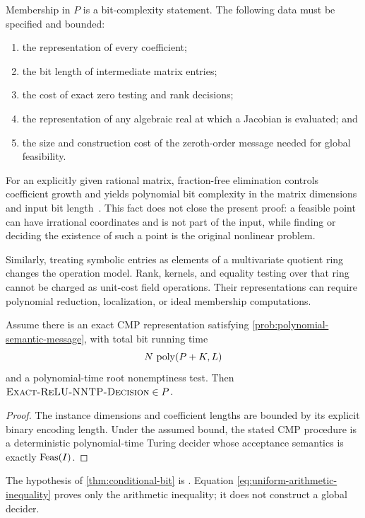 Membership in \(P\) is a bit-complexity statement.  The following data must be
specified and bounded:

\begin{enumerate}
  \item the representation of every coefficient;
  \item the bit length of intermediate matrix entries;
  \item the cost of exact zero testing and rank decisions;
  \item the representation of any algebraic real at which a Jacobian is
  evaluated; and
  \item the size and construction cost of the zeroth-order message needed for
  global feasibility.
\end{enumerate}

For an explicitly given rational matrix, fraction-free elimination controls
coefficient growth and yields polynomial bit complexity in the matrix
dimensions and input bit length~\cite{Bareiss1968}.  This fact does not close
the present proof: a feasible point can have irrational coordinates and is not
part of the input, while finding or deciding the existence of such a point is
the original nonlinear problem.

Similarly, treating symbolic entries as elements of a multivariate quotient
ring changes the operation model.  Rank, kernels, and equality testing over
that ring cannot be charged as unit-cost field operations.  Their
representations can require polynomial reduction, localization, or ideal
membership computations.

\begin{theorem}
\label{thm:conditional-bit}
Assume there is an exact CMP representation satisfying
\cref{prob:polynomial-semantic-message}, with total bit running time
\begin{equation}
  N\,\operatorname{poly}(P+K,L)
  \label{eq:desired-bit-bound}
\end{equation}
and a polynomial-time root nonemptiness test.  Then
\(\textnormal{\textsc{Exact-ReLU-NNTP-Decision}}\in P\).
\end{theorem}

\begin{proof}
The instance dimensions and coefficient lengths are bounded by its explicit
binary encoding length.  Under the assumed bound, the stated CMP procedure is
a deterministic polynomial-time Turing decider whose acceptance semantics is
exactly \(\operatorname{Feas}(I)\).
\end{proof}

\begin{remark}
The hypothesis of \cref{thm:conditional-bit} is \openstatus.  Equation
\cref{eq:uniform-arithmetic-inequality} proves only the arithmetic inequality;
it does not construct a global decider.
\end{remark}
